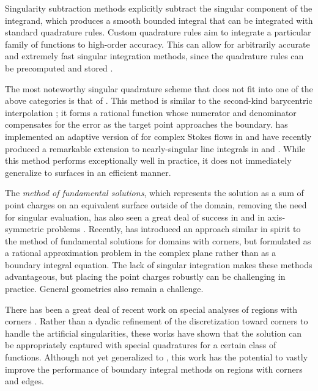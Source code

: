 Singularity subtraction methods \cite{jarvenpaa2003singularity, jarvenpaa2006singularity, nair2013singularity} explicitly subtract the singular component of the integrand, which produces a smooth bounded integral that can be integrated with standard quadrature rules.
Custom quadrature rules aim to integrate a particular family of functions to high-order accuracy.
This can allow for arbitrarily accurate and extremely fast singular integration methods, since the quadrature rules can be precomputed and stored \cite{alpert1999hybrid, xiao2010numerical}.

The most noteworthy singular quadrature scheme that does not fit into one of the above categories is that of \cite{HO}. 
This method is similar to the second-kind barycentric interpolation \cite{BT}; it forms a rational function whose numerator and denominator compensates for the error as the target point approaches the boundary. 
\cite{wu2020solution} has implemented an adaptive version of \cite{HO} for complex Stokes flows in \twod and
\cite{klinteberg2019accurate} have recently produced a remarkable extension to nearly-singular line integrals in \twod and \threed.
While this method performs exceptionally well in practice, it does not immediately generalize to \threed surfaces in an efficient manner.

The \textit{method of fundamental solutions}, which represents the solution as a sum of point charges on an equivalent surface outside of the \pde domain, removing the need for singular evaluation, has also seen a great deal of success in \twod \cite{barnett2008stability} and in axis-symmetric \threed problems \cite{liu2016efficient}. Recently, \cite{gopal2019solving} has introduced an \twod approach similar in spirit to the method of fundamental solutions for domains with corners, but formulated as a rational approximation problem in the complex plane rather than as a boundary integral equation. 
The lack of singular integration makes these methods advantageous, but placing the point charges robustly can be challenging in practice. 
General \threed geometries also remain a challenge.

There has been a great deal of recent work on special analyses of regions with corners \cite{SR,S,serkh2018solution,hoskins2019numerical,rachh2017solution,serkh2016solution}.
Rather than a dyadic refinement of the discretization toward corners to handle the artificial singularities, these works have shown that the solution can be appropriately captured with special quadratures for a certain class of functions.
Although not yet generalized to \threed, this work has the potential to vastly improve the performance of \threed \nystrom boundary integral methods on regions with corners and edges.

